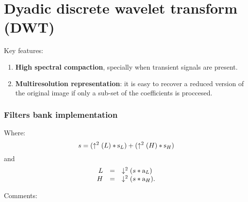 


\section{Dyadic discrete wavelet transform (DWT)}
Key features:

\begin{enumerate}
\def\labelenumi{\arabic{enumi}.}
\tightlist
\item
  \textbf{High spectral compaction}, specially when transient signals
  are present.
\item
  \textbf{Multiresolution representation}: it is easy to recover a
  reduced version of the original image if only a sub-set of the
  coeﬃcients is proccesed.
\end{enumerate}

    \hypertarget{filters-bank-implementation}{%
\subsubsection{Filters bank
implementation}\label{filters-bank-implementation}}

Where: \begin{equation}
  s = (\uparrow^2(L)*{\text s}_L) + (\uparrow^2(H)*{\text s}_H)
\end{equation} and \begin{equation}
  \begin{array}{rcl}
    L & = & \downarrow^2(s*{\text a}_L) \\
    H & = & \downarrow^2(s*{\text a}_H).
  \end{array}
\end{equation}

Comments:

